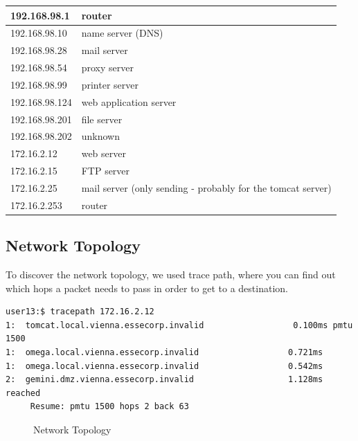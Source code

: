 \documentclass[12pt,a4paper,titlepage,oneside]{scrartcl}
\begin{document}
\begin{tabular}{| l | l |}
\hline
192.168.98.1 & router \\ \hline
192.168.98.10 & name server (DNS) \\ \hline
192.168.98.28 & mail server \\ \hline
192.168.98.54 & proxy server \\ \hline
192.168.98.99 & printer server \\ \hline
192.168.98.124 & web application server \\ \hline
192.168.98.201 & file server \\ \hline
192.168.98.202 & unknown \\ \hline
172.16.2.12 & web server \\ \hline
172.16.2.15 & FTP server \\ \hline
172.16.2.25 & mail server (only sending - probably for the tomcat server) \\ \hline
172.16.2.253 & router \\ \hline
\end{tabular}

\subsection{Network Topology}
To discover the network topology, we used trace path, where you can find out which hops a packet needs to pass in order to get to a destination.

\begin{lstlisting}[style=simple]
user13:$ tracepath 172.16.2.12
1:  tomcat.local.vienna.essecorp.invalid                  0.100ms pmtu 1500
1:  omega.local.vienna.essecorp.invalid                  0.721ms 
1:  omega.local.vienna.essecorp.invalid                  0.542ms 
2:  gemini.dmz.vienna.essecorp.invalid                   1.128ms reached
     Resume: pmtu 1500 hops 2 back 63 
\end{lstlisting}

\begin{figure}[h!]
  \centering
  \caption{Network Topology}
\end{figure}
\end{document}
